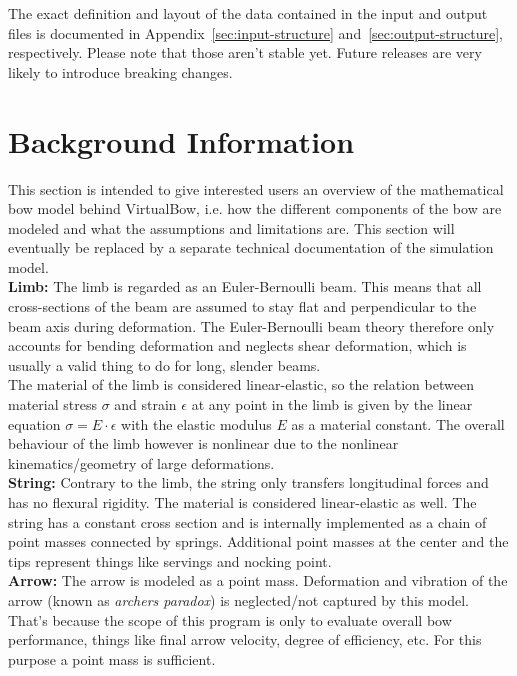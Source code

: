 \documentclass[12pt]{article}
\begin{document}
The exact definition and layout of the data contained in the input and output files is documented in Appendix~\ref{sec:input-structure} and~\ref{sec:output-structure}, respectively. Please note that those aren't stable yet. Future releases are very likely to introduce breaking changes.

\newpage
\section{Background Information}

This section is intended to give interested users an overview of the mathematical bow model behind VirtualBow, i.e. how the different components of the bow are modeled and what the assumptions and limitations are.
This section will eventually be replaced by a separate technical documentation of the simulation model.\\

\textbf{Limb:} The limb is regarded as an Euler-Bernoulli beam.
This means that all cross-sections of the beam are assumed to stay flat and perpendicular to the beam axis during deformation.
The Euler-Bernoulli beam theory therefore only accounts for bending deformation and neglects shear deformation, which is usually a valid thing to do for long, slender beams.\\

The material of the limb is considered linear-elastic, so the relation between material stress $\sigma$ and strain $\epsilon$ at any point in the limb is given by the linear equation $\sigma = E\cdot \epsilon$ with the elastic modulus $E$ as a material constant.
The overall behaviour of the limb however is nonlinear due to the nonlinear kinematics/geometry of large deformations.\\

\textbf{String:} Contrary to the limb, the string only transfers longitudinal forces and has no flexural rigidity.
The material is considered linear-elastic as well.
The string has a constant cross section and is internally implemented as a chain of point masses connected by springs.
Additional point masses at the center and the tips represent things like servings and nocking point.\\

\textbf{Arrow:} The arrow is modeled as a point mass.
Deformation and vibration of the arrow (known as \textit{archers paradox}) is neglected/not captured by this model.
That's because the scope of this program is only to evaluate overall bow performance, things like final arrow velocity, degree of efficiency, etc.
For this purpose a point mass is sufficient.\\
\end{document}
